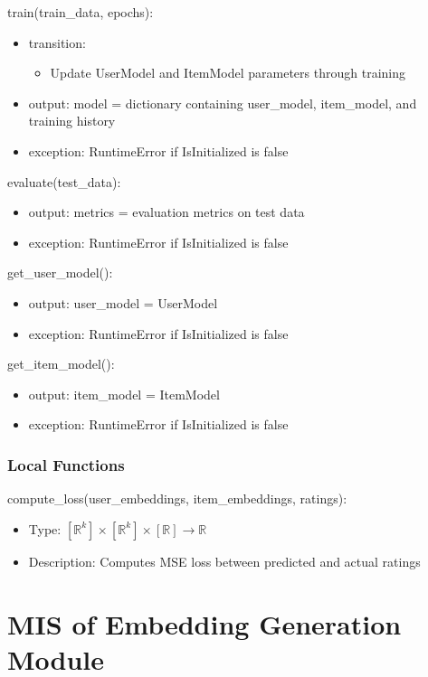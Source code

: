 \documentclass[12pt, titlepage]{article}
\begin{document}
\noindent train(train\_data, epochs):
\begin{itemize}
\item transition:
  \begin{itemize}
    \item Update UserModel and ItemModel parameters through training
  \end{itemize}
\item output: model = dictionary containing user\_model, item\_model, and training history
\item exception: RuntimeError if IsInitialized is false
\end{itemize}
\noindent evaluate(test\_data):
\begin{itemize}
\item output: metrics = evaluation metrics on test data
\item exception: RuntimeError if IsInitialized is false
\end{itemize}

\noindent get\_user\_model():
\begin{itemize}
\item output: user\_model = UserModel
\item exception: RuntimeError if IsInitialized is false
\end{itemize}

\noindent get\_item\_model():
\begin{itemize}
\item output: item\_model = ItemModel
\item exception: RuntimeError if IsInitialized is false
\end{itemize}

\subsubsection{Local Functions}
compute\_loss(user\_embeddings, item\_embeddings, ratings):
\begin{itemize}
  \item Type: $[\mathbb{R}^k]\times[\mathbb{R}^k]\times[\mathbb{R}] \rightarrow \mathbb{R}$
  \item Description: Computes MSE loss between predicted and actual ratings
\end{itemize}

\section{MIS of Embedding Generation Module} \label{ModuleEG}
\end{document}
